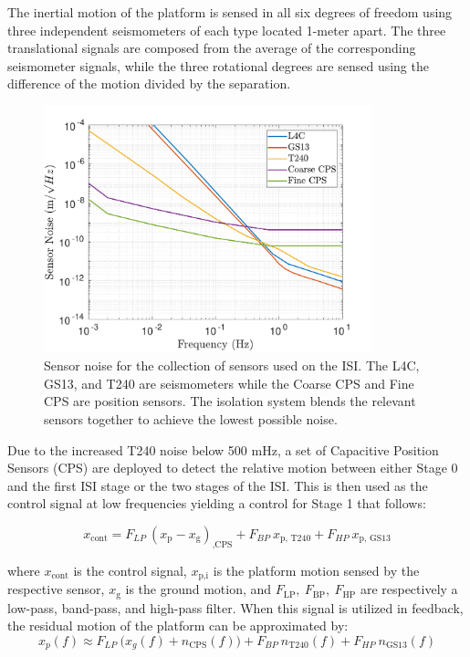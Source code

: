 \documentclass [12pt, proquest]{uwthesis}[2019]
\begin{document}
The inertial motion of the platform is sensed in all six degrees of freedom using three independent seismometers of each type located 1-meter apart. The three translational signals are composed from the average of the corresponding seismometer signals, while the three rotational degrees are sensed using the difference of the motion divided by the separation.

\begin{figure}[!h]
\begin{center}
\includegraphics[width=0.85\textwidth]{seismicSensNoise.pdf}
\caption[Sensor noise for the seismic isolation system]{Sensor noise for the collection of sensors used on the ISI. The L4C, GS13, and T240 are seismometers while the Coarse CPS and Fine CPS are position sensors. The isolation system blends the relevant sensors together to achieve the lowest possible noise.}
\label{seisNoise}
\end{center}
\end{figure}

Due to the increased T240 noise below 500 mHz, a set of Capacitive Position Sensors (CPS) are deployed to detect the relative motion between either Stage 0 and the first ISI stage or the two stages of the ISI. This is then used as the control signal at low frequencies yielding a control for Stage 1 that follows:

\begin{equation}
x_\text{cont}=F_{LP}\ (x_\text{p}-x_\text{g})_\text{,CPS}+F_{BP}\ x_\text{p, T240}+F_{HP}\ x_\text{p, GS13}
\end{equation}

where $x_\text{cont}$ is the control signal, $x_\text{p,i}$ is the platform motion sensed by the respective sensor, $x_\text{g}$ is the ground motion, and $F_\text{LP},\  F_\text{BP},\ F_\text{HP}$ are respectively a low-pass, band-pass, and high-pass filter. When this signal is utilized in feedback, the residual motion of the platform can be approximated by:
\begin{equation}
x_p(f)\approx F_{LP}\ \big(x_g(f)+n_\text{CPS}(f)\big)+F_{BP}\ n_\text{T240}(f)+F_{HP}\ n_\text{GS13}(f)
\end{equation}
\end{document}
